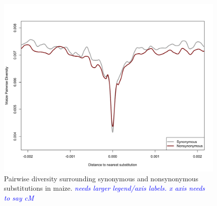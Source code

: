 \documentclass{pnastwo}
\newcommand{\jri}[1]{\textcolor{blue}{\emph{#1}} }
\begin{document}
\begin{article}
\begin{figure}[b]
\centering
\includegraphics[width=.5\textwidth]{FigsAndFiles/plotDiversity_TvM_Folded2_unNeutralized}
\caption{Pairwise diversity surrounding synonymous and nonsynonymous
  substitutions in maize. \jri{needs larger legend/axis labels. x axis needs to say cM}}
\label{hardSweeps}
\end{figure}



\end{article}
\end{document}
